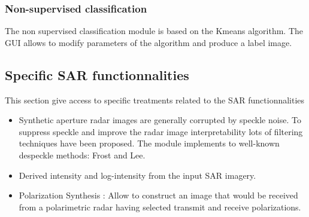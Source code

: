 \subsubsection{Non-supervised classification}
The non supervised classification module is based on the Kmeans
algorithm.  The GUI allows to modify parameters of the algorithm and
produce a label image.
\subsection{Specific SAR functionnalities}
This section give access to specific treatments related to the SAR
functionnalities

\begin{itemize}
\item Synthetic aperture radar images are generally corrupted by
  speckle noise.  To suppress speckle and improve the radar image
  interpretability lots of filtering techniques have been proposed.
  The module implements to well-known despeckle methods: Frost and
  Lee.
\item Derived intensity and log-intensity from the input SAR imagery.
\item Polarization Synthesis : Allow to construct an image that would
  be received from a polarimetric radar having selected transmit and
  receive polarizations.
\end{itemize}
